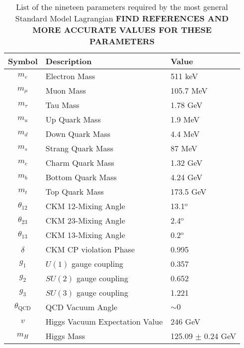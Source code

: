 \begin{table}[H]
\begin{center}
\begin{tabular}{ c | l | l }
\toprule
Symbol	&	Description	&	Value \\
\hline \hline
$m_{e}$	& Electron Mass	& 511 keV \\
\hline
$m_{\mu}$	& Muon Mass	& 105.7 MeV \\
\hline
$m_{\tau}$	& Tau Mass	& 1.78 GeV\\
\hline
$m_{u}$	& Up Quark Mass	& 1.9 MeV \\
\hline
$m_{d}$	& Down Quark Mass	& 4.4 MeV \\
\hline
$m_{s}$	& Strang Quark Mass	& 87 MeV\\
\hline
$m_{c}$	& Charm Quark Mass	& 1.32 GeV \\
\hline
$m_{b}$	& Bottom Quark Mass	& 4.24 GeV \\
\hline
$m_{t}$	& Top Quark Mass	& 173.5 GeV \\
\hline
$\theta_{12}$	& CKM 12-Mixing Angle	& 13.1$^{\textrm{o}}$	\\
\hline
$\theta_{23}$	& CKM 23-Mixing Angle	& 2.4$^{\textrm{o}}$ 	\\
\hline
$\theta_{13}$	& CKM 13-Mixing Angle	& 0.2$^{\textrm{o}}$	\\
\hline
$\delta$	& CKM CP violation Phase	& 0.995	\\
\hline
$g_{1}$	& $U(1)$ gauge coupling	& 0.357	\\
\hline
$g_{2}$	& $SU(2)$ gauge coupling	& 0.652	\\
\hline
$g_{3}$	& $SU(3)$ gauge coupling	& 1.221	\\
\hline
$\theta_{\textrm{QCD}}$	& QCD Vacuum Angle	& $\sim 0$	\\
\hline
$v$ 	& Higgs Vacuum Expectation Value	& 246 GeV	\\
\hline
$m_{H}$	& Higgs Mass	& 125.09 $\pm$ 0.24 GeV	\\
\bottomrule
\end{tabular}
\end{center}
\caption{List of the nineteen parameters required by the most general Standard Model Lagrangian \textbf{FIND REFERENCES AND MORE ACCURATE VALUES FOR THESE PARAMETERS}}
\label{tab:parameters}
\end{table} 